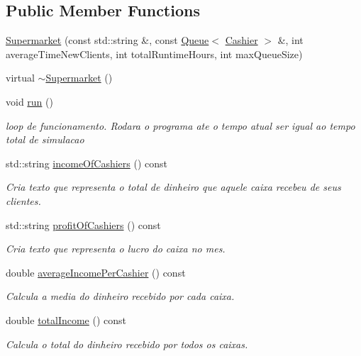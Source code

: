 \subsection*{Public Member Functions}
\begin{DoxyCompactItemize}
\item 
\hyperlink{classSupermarket_a4d3d0ed8426d0f3d0be3424ba9f34ba7}{Supermarket} (const std\-::string \&, const \hyperlink{classQueue}{Queue}$<$ \hyperlink{classCashier}{Cashier} $>$ \&, int average\-Time\-New\-Clients, int total\-Runtime\-Hours, int max\-Queue\-Size)
\item 
virtual \hyperlink{classSupermarket_a6140b300fddafd73ab29cf823baf5951}{$\sim$\-Supermarket} ()
\item 
void \hyperlink{classSupermarket_af2807840b2e04b8988f359d9e34960ea}{run} ()
\begin{DoxyCompactList}\small\item\em loop de funcionamento. Rodara o programa ate o tempo atual ser igual ao tempo total de simulacao \end{DoxyCompactList}\item 
std\-::string \hyperlink{classSupermarket_a3cb0363d56004ae5f42863d00bb952da}{income\-Of\-Cashiers} () const 
\begin{DoxyCompactList}\small\item\em Cria texto que representa o total de dinheiro que aquele caixa recebeu de seus clientes. \end{DoxyCompactList}\item 
std\-::string \hyperlink{classSupermarket_a2e35d76f55bf6b5669b5101a2d7ebc93}{profit\-Of\-Cashiers} () const 
\begin{DoxyCompactList}\small\item\em Cria texto que representa o lucro do caixa no mes. \end{DoxyCompactList}\item 
double \hyperlink{classSupermarket_ab66a7fa61f23cc679011305fa2b5688f}{average\-Income\-Per\-Cashier} () const 
\begin{DoxyCompactList}\small\item\em Calcula a media do dinheiro recebido por cada caixa. \end{DoxyCompactList}\item 
double \hyperlink{classSupermarket_a300fa556a29dc813bc29647df30d0cc3}{total\-Income} () const 
\begin{DoxyCompactList}\small\item\em Calcula o total do dinheiro recebido por todos os caixas. \end{DoxyCompactList}\item 

\end{DoxyCompactItemize}
